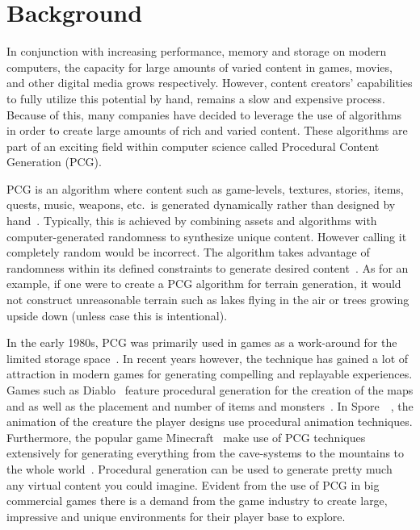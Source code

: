 \section{Background}

In conjunction with increasing performance, memory and storage on modern computers, the capacity for large amounts of varied content in games, movies, and other digital media grows respectively.
However, content creators' capabilities to fully utilize this potential by hand, remains a slow and expensive process.
Because of this, many companies have decided to leverage the use of algorithms in order to create large amounts of rich and varied content.
These algorithms are part of an exciting field within computer science called Procedural Content Generation (PCG).

PCG is an algorithm where content such as game-levels, textures, stories, items, quests, music, weapons, etc.\ is generated dynamically rather than designed by hand~\cite[p.1]{PCG_in_games}.
Typically, this is achieved by combining assets and algorithms with computer-generated randomness to synthesize unique content. However calling it completely random would be incorrect.
The algorithm takes advantage of randomness within its defined constraints to generate desired content~\cite{Gamasutra}.
As for an example, if one were to create a PCG algorithm for terrain generation, it would not construct unreasonable terrain such as lakes flying in the air or trees growing upside down (unless case this is intentional). 
	
In the early 1980s, PCG was primarily used in games as a work-around for the limited storage space~\cite[p.4]{PCG_in_games}.
In recent years however, the technique has gained a lot of attraction in modern games for generating compelling and replayable experiences.
Games such as Diablo~\cite{diablo} feature procedural generation for the creation of the maps and as well as the placement and number of items and monsters~\cite[p.4]{PCG_in_games}.
In Spore~\cite{spore}~, the animation of the creature the player designs use procedural animation techniques\cite[p.4]{PCG_in_games}.
Furthermore, the popular game Minecraft~\cite{minecraft} make use of PCG techniques extensively for generating everything from the cave-systems to the mountains to the whole world~\cite[p.4]{PCG_in_games}.
Procedural generation can be used to generate pretty much any virtual content you could imagine.
Evident from the use of PCG in big commercial games there is a demand from the game industry to create large, impressive and unique environments for their player base to explore.

